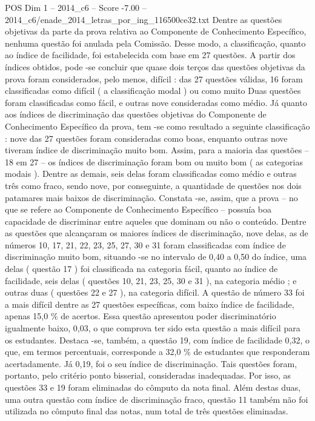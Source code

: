 \begin{textsample}{POS Dim 1 – 2014\_c6 – Score -7.00 – 2014\_c6/enade\_2014\_letras\_por\_ing\_116500ce32.txt}
Dentre as questões objetivas da parte da prova relativa ao Componente de Conhecimento Específico, nenhuma questão foi anulada pela Comissão.
Desse modo, a classificação, quanto ao índice de facilidade, foi estabelecida com base em 27 questões.
A partir dos índices obtidos, pode -se concluir que quase dois terços das questões objetivas da prova foram considerados, pelo menos, difícil : das 27 questões válidas, 16 foram classificadas como difícil ( a classificação modal ) ou como muito Duas questões foram classificadas como fácil, e outras nove consideradas como médio.
Já quanto aos índices de discriminação das questões objetivas do Componente de Conhecimento Específico da prova, tem -se como resultado a seguinte classificação : nove das 27 questões foram consideradas como boas, enquanto outras nove tiveram índice de discriminação muito bom.
Assim, para a maioria das questões – 18 em 27 – os índices de discriminação foram bom ou muito bom ( as categorias modais ).
Dentre as demais, seis delas foram classificadas como médio e outras três como fraco, sendo nove, por conseguinte, a quantidade de questões nos dois patamares mais baixos de discriminação.
Constata -se, assim, que a prova – no que se refere ao Componente de Conhecimento Específico – possuía boa capacidade de discriminar entre aqueles que dominam ou não o conteúdo.
Dentre as questões que alcançaram os maiores índices de discriminação, nove delas, as de números 10, 17, 21, 22, 23, 25, 27, 30 e 31 foram classificadas com índice de discriminação muito bom, situando -se no intervalo de 0,40 a 0,50 do índice, uma delas ( questão 17 ) foi classificada na categoria fácil, quanto ao índice de facilidade, seis delas ( questões 10, 21, 23, 25, 30 e 31 ), na categoria médio ; e outras duas ( questões 22 e 27 ), na categoria difícil.
A questão de número 33 foi a mais difícil dentre as 27 questões específicas, com baixo índice de facilidade, apenas 15,0 \% de acertos.
Essa questão apresentou poder discriminatório igualmente baixo, 0,03, o que comprova ter sido esta questão a mais difícil para os estudantes.
Destaca -se, também, a questão 19, com índice de facilidade 0,32, o que, em termos percentuais, corresponde a 32,0 \% de estudantes que responderam acertadamente.
Já 0,19, foi o seu índice de discriminação.
Tais questões foram, portanto, pelo critério ponto bisserial, consideradas inadequadas.
Por isso, as questões 33 e 19 foram eliminadas do cômputo da nota final.
Além destas duas, uma outra questão com índice de discriminação fraco, questão 11 também não foi utilizada no cômputo final das notas, num total de três questões eliminadas.

\end{textsample}
